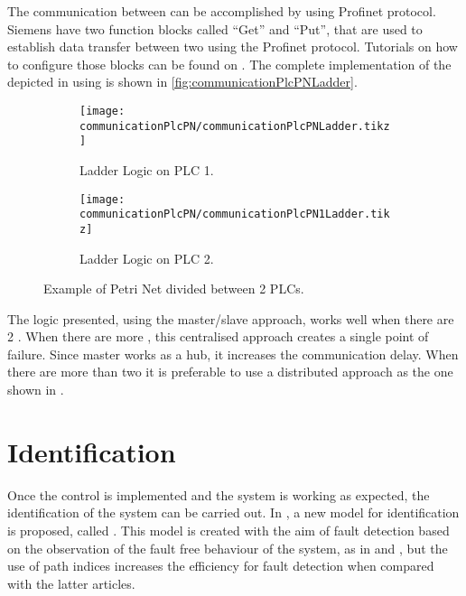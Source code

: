 The communication between \PLCs{} can be accomplished by using Profinet
protocol. Siemens \PLCs{} have two function blocks called ``Get'' and
``Put'', that are used to establish data transfer between two \PLCs{} using the
Profinet protocol. Tutorials on how to configure those blocks can be found on \citep{antunesfloriano2019sincronizacao,oliveira2016protocolo,rochapereira2019automacao}.
The complete implementation of the \CIPN{} depicted in
 using \LD{} is shown in \autoref{fig:communicationPlcPNLadder}.

\begin{figure}[H]
  \centering
  \begin{subfigure}[t]{0.45\textwidth}
    \centering
    \texttt{[image: communicationPlcPN/communicationPlcPNLadder.tikz]}
    \caption{Ladder Logic on PLC 1.}
    \label{fig:communicationPlcPN1Ladder}
  \end{subfigure}%
  \hfill
  \begin{subfigure}[t]{0.45\textwidth}
    \centering
    \texttt{[image: communicationPlcPN/communicationPlcPN1Ladder.tikz]}
    \caption{Ladder Logic on PLC 2.}
    \label{fig:communicationPlcPN2Ladder}
  \end{subfigure}
  \caption{Example of Petri Net divided between 2 PLCs.}
  \label{fig:communicationPlcPNLadder}
\end{figure}



The logic presented, using the master\slash slave approach, works well when
there are 2 \PLCs. When there are more \PLCs, this centralised approach
creates a single point of failure. Since master \PLC{} works as a hub, it
increases the communication delay. When there are more than two \PLCs{} it is
preferable to use a distributed approach as the one shown in
\cite{antunesfloriano2019sincronizacao}.

\section{Identification}
\label{sec:identification}

Once the control is implemented and the system is working as expected, the
identification of the system can be carried out.
In \cite{moreira2018enhanced}, a new model for \DES{} identification is proposed, called
\DAOCT. This model is created with the aim of fault detection based
on the observation of the fault free behaviour of the system, as in \cite{roth2009fdi} and \cite{klein2005fault}, but the use of path indices increases the
efficiency for fault detection when compared with the latter articles.

